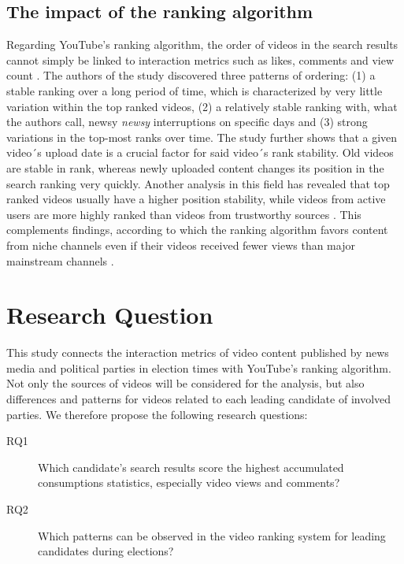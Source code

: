 \documentclass[sigchi, nonacm=true]{acmart}
\begin{document}
  \subsection{The impact of the ranking algorithm}
    Regarding YouTube’s ranking algorithm, the order of videos in the search results cannot simply be linked to interaction metrics such as likes, comments and view count \cite{rieder_ranking_2018}.
    The authors of the study discovered three patterns of ordering: (1) a stable ranking over a long period of time, which is characterized by very little variation within the top ranked videos, (2) a relatively stable ranking with, what the authors call, newsy \textit{newsy} interruptions \cite[p. 63]{rieder_ranking_2018} on specific days and (3) strong variations in the top-most ranks over time. The study further shows that a given video´s upload date is a crucial factor for said video´s rank stability. Old videos are stable in rank, whereas newly uploaded content changes its position in the search ranking very quickly. Another analysis in this field has revealed that top ranked videos usually have a higher position stability, while videos from active users are more highly ranked than videos from trustworthy sources \cite{fernandez-llatas_are_2017}. This complements findings, according to which the ranking algorithm favors content from niche channels even if their videos received fewer views than major mainstream channels \cite{rieder_ranking_2018}.

  \section{Research Question}
    This study connects the interaction metrics of video content published by news media and political parties in election times with YouTube’s ranking algorithm. Not only the sources of videos will be considered for the analysis, but also differences and patterns for videos related to each leading candidate of involved parties. We therefore propose the following research questions:
    \begin{description}
      \item[RQ1] Which candidate’s search results score the highest accumulated consumptions statistics, especially video views and comments?
      \item[RQ2] Which patterns can be observed in the video ranking system for leading candidates during elections?
    \end{description}
\end{document}
